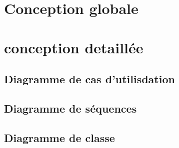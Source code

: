 \section{Conception globale}
\lipsum[2-2]
\section{conception detaillée}
\lipsum[2-2]
\subsection{Diagramme de cas d'utilisdation}
\lipsum[2-2]
\subsection{Diagramme de séquences}
\lipsum[2-2]
\subsection{Diagramme de classe}
\lipsum[2-2]
